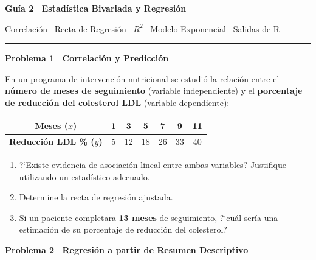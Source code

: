 \documentclass[10pt,letterpaper]{article}
\newcommand{\seccion}[1]{%
  \vspace{2pt}%
  \begin{tcolorbox}[enhanced,colback=white,colframe=black,arc=0pt,boxrule=0pt,
    leftrule=2pt,left=6pt,right=6pt,top=1pt,bottom=1pt]
    {\normalsize\bfseries\sffamily #1}
  \end{tcolorbox}%
  \vspace{1pt}%
}
\begin{document}
\thispagestyle{empty}

\begin{center}
  {\fontsize{15}{17}\selectfont\bfseries\sffamily Gu\'ia 2 \textendash\ Estad\'istica Bivariada y Regresi\'on\par}
  \vspace{0.05cm}
  {\small\sffamily Correlaci\'on \textperiodcentered\ Recta de Regresi\'on \textperiodcentered\ $R^2$ \textperiodcentered\ Modelo Exponencial \textperiodcentered\ Salidas de \textsf{R}\par}
  {\rule{3cm}{0.6pt}}
\end{center}

\vspace{0.15cm}

\seccion{Problema 1 \textendash\ Correlaci\'on y Predicci\'on}

\noindent\sffamily\small En un programa de intervenci\'on nutricional se estudi\'o la relaci\'on entre el \textbf{n\'umero de meses de seguimiento} (variable independiente) y el \textbf{porcentaje de reducci\'on del colesterol LDL} (variable dependiente):

\vspace{4pt}
\begin{center}
\small\sffamily
\begin{tabular}{|c|c|c|c|c|c|c|}
\hline
\textbf{Meses ($x$)} & 1 & 3 & 5 & 7 & 9 & 11 \\
\hline
\textbf{Reducci\'on LDL \% ($y$)} & 5 & 12 & 18 & 26 & 33 & 40 \\
\hline
\end{tabular}
\end{center}
\vspace{4pt}

\begin{enumerate}[leftmargin=1.2cm, label=\textbf{\alph*)}, itemsep=2pt, topsep=2pt]
  \item ?`Existe evidencia de asociaci\'on lineal entre ambas variables? Justifique utilizando un estad\'istico adecuado.
  \item Determine la recta de regresi\'on ajustada.
  \item Si un paciente completara \textbf{13 meses} de seguimiento, ?`cu\'al ser\'ia una estimaci\'on de su porcentaje de reducci\'on del colesterol?
\end{enumerate}

\seccion{Problema 2 \textendash\ Regresi\'on a partir de Resumen Descriptivo}
\end{document}
